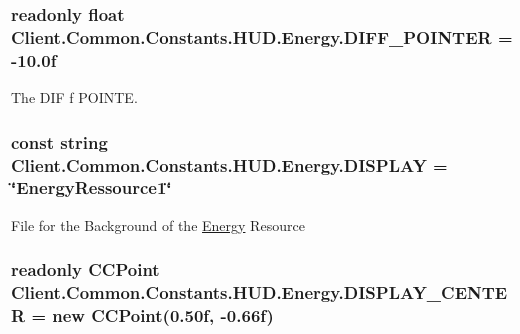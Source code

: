 \subsubsection[{D\+I\+F\+F\+\_\+\+P\+O\+I\+N\+T\+E\+R}]{\setlength{\rightskip}{0pt plus 5cm}readonly float Client.\+Common.\+Constants.\+H\+U\+D.\+Energy.\+D\+I\+F\+F\+\_\+\+P\+O\+I\+N\+T\+E\+R = -\/10.\+0f\hspace{0.3cm}{\ttfamily [static]}}\label{classClient_1_1Common_1_1Constants_1_1HUD_1_1Energy_a76f90c964a89ef1b996a17137a3d6518}


The D\+I\+F f P\+O\+I\+N\+T\+E. 

\hypertarget{classClient_1_1Common_1_1Constants_1_1HUD_1_1Energy_a087f3ea0c09018ae05a32a6e2dc27d09}{}
\subsubsection[{D\+I\+S\+P\+L\+A\+Y}]{\setlength{\rightskip}{0pt plus 5cm}const string Client.\+Common.\+Constants.\+H\+U\+D.\+Energy.\+D\+I\+S\+P\+L\+A\+Y = \char`\"{}Energy\+Ressource1\char`\"{}}\label{classClient_1_1Common_1_1Constants_1_1HUD_1_1Energy_a087f3ea0c09018ae05a32a6e2dc27d09}


File for the Background of the \hyperlink{classClient_1_1Common_1_1Constants_1_1HUD_1_1Energy}{Energy} Resource 

\hypertarget{classClient_1_1Common_1_1Constants_1_1HUD_1_1Energy_ac1fbcbb6f266711bfc24c1280866bfaa}{}
\subsubsection[{D\+I\+S\+P\+L\+A\+Y\+\_\+\+C\+E\+N\+T\+E\+R}]{\setlength{\rightskip}{0pt plus 5cm}readonly C\+C\+Point Client.\+Common.\+Constants.\+H\+U\+D.\+Energy.\+D\+I\+S\+P\+L\+A\+Y\+\_\+\+C\+E\+N\+T\+E\+R = new C\+C\+Point(0.\+50f, -\/0.\+66f)\hspace{0.3cm}{\ttfamily [static]}}\label{classClient_1_1Common_1_1Constants_1_1HUD_1_1Energy_ac1fbcbb6f266711bfc24c1280866bfaa}


